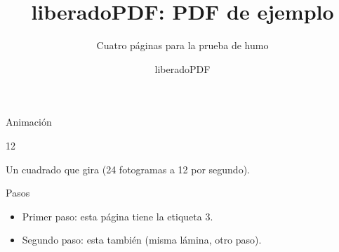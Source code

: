 \documentclass[aspectratio=169]{beamer}
\title{liberadoPDF: PDF de ejemplo}
\subtitle{Cuatro páginas para la prueba de humo}
\author{liberadoPDF}
\date{}
\begin{document}
\begin{frame}
  \titlepage
\end{frame}

\begin{frame}{Animación}
  \centering
  \begin{animateinline}[autoplay,loop,poster=first]{12}
  \end{animateinline}
  \par Un cuadrado que gira (24 fotogramas a 12 por segundo).
\end{frame}

\begin{frame}{Pasos}
  \begin{itemize}
    \item Primer paso: esta página tiene la etiqueta 3.
    \pause
    \item Segundo paso: esta también (misma lámina, otro paso).
  \end{itemize}
\end{frame}
\end{document}
